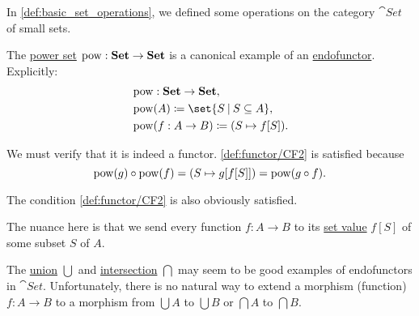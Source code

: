 \begin{example}\label{ex:unary_functors_in_set}
  In \cref{def:basic_set_operations}, we defined some operations on the category \hyperref[def:category_of_small_sets]{\( \cat{Set} \)} of small sets.

  \begin{thmenum}
     The \hyperref[def:basic_set_operations/power_set]{power set} \( \pow: \cat{Set} \to \cat{Set} \) is a canonical example of an \hyperref[def:functor/endofunctor]{endofunctor}. Explicitly:
    \begin{equation*}
      \begin{aligned}
        &\pow: \cat{Set} \to \cat{Set}, \\
        &\pow(A) \coloneqq \set{ S \given S \subseteq A }, \\
        &\pow(f: A \to B) \coloneqq (S \mapsto f[S]). \\
      \end{aligned}
    \end{equation*}

    We must verify that it is indeed a functor. \ref{def:functor/CF2} is satisfied because
    \begin{equation*}
      \pow(g) \bincirc \pow(f) = (S \mapsto g[f[S]]) = \pow(g \bincirc f).
    \end{equation*}

    The condition \ref{def:functor/CF2} is also obviously satisfied.

    The nuance here is that we send every function \( f: A \to B \) to its \hyperref[def:set_valued_map/image]{set value} \( f[S] \) of some subset \( S \) of \( A \).

     The \hyperref[def:basic_set_operations/union]{union} \( \bigcup \) and \hyperref[def:basic_set_operations/intersection]{intersection} \( \bigcap \) may seem to be good examples of endofunctors in \( \cat{Set} \). Unfortunately, there is no natural way to extend a morphism (function) \( f: A \to B \) to a morphism from \( \bigcup A \) to \( \bigcup B \) or \( \bigcap A \) to \( \bigcap B \).
  \end{thmenum}
\end{example}

